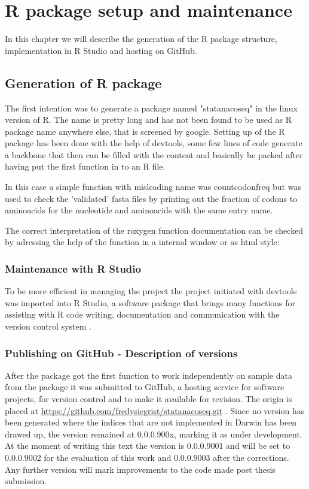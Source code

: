 \chapter{R package setup and maintenance}
In this chapter we will describe the generation of the R package structure, implementation in R Studio and hosting on GitHub.


\section{Generation of R package}
The first intention was to generate a package named "statanacoseq" in the linux version of R. The name is pretty long and has not been found to be used as R package name anywhere else, that is screened by google.
Setting up of the R package has been done with the help of devtools, some few lines of code generate a backbone that then can be filled with the content and basically be packed after having put the first function in to an R file. 

  

In this case a simple function with misleading name was countcodonfreq but was used to check the 'validated' fasta files by printing out the fraction of codons to aminoacids for the nucleotide and aminoacids with the same entry name. 
  
The correct interpretation of the roxygen function documentation can be checked by adressing the help of the function in a internal window or as html style:
  

\subsection{Maintenance with R Studio}
To be more efficient in managing the project the project initiated with devtools was imported into R Studio, a software package that brings many functions for assisting with R code writing, documentation and communication with the version control system \cite{Rstudio2015}. 

\subsection{Publishing on GitHub - Description of versions}
After the package got the first function to work independently on sample data from the package it was submitted to GitHub, a hosting service for software projects, for version control and to make it available for revision. The origin is placed at \href{https://github.com/fredysiegrist/statanacoseq.git}{https://github.com/fredysiegrist/statanacoseq.git} \cite{Charles2013}. Since no version has been generated where the indices that are not implemented in Darwin has been drawed up, the version remained at 0.0.0.900x, marking it as under development. At the moment of writing this text the version is 0.0.0.9001 and will be set to 0.0.0.9002 for the evaluation of this work and 0.0.0.9003 after the corrections. Any further version will mark improvements to the code made post thesis submission.

